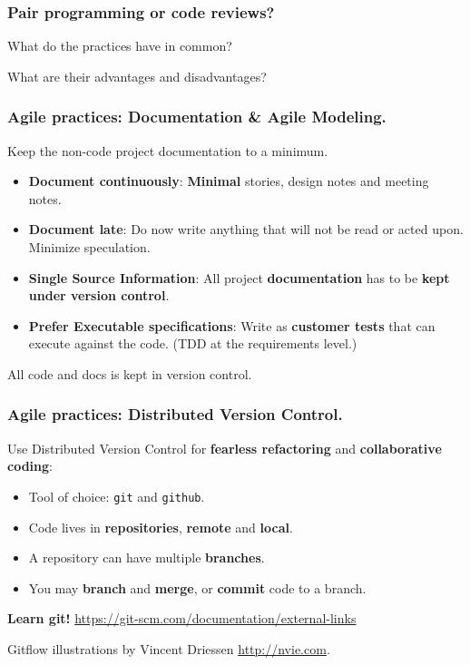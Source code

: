 \documentclass{beamer} %
\newcommand\emc[1]{\textcolor{brightblue}{\textbf{#1}}}
\begin{document}
\begin{frame}
\frametitle{Pair programming or code reviews?}

What do the practices have in common?

\vspace{5mm}
What are their advantages and disadvantages?

\end{frame}



\begin{frame}

\frametitle{Agile practices: Documentation \& Agile Modeling.}

Keep the non-code project documentation to a minimum.
\begin{itemize}
\item \emc{Document continuously}: \emc{Minimal} stories, design notes and meeting notes.
\item \emc{Document late}: Do now write anything that will not be read or acted upon. Minimize speculation.
\item \emc{Single Source Information}: All project \emc{documentation} has to be \emc{kept under version control}.
\item \emc{Prefer Executable specifications}: Write as \emc{customer tests} that can execute against the code. (TDD at the requirements level.)
\end{itemize}

\vspace{5mm}
All code and docs is kept in version control.
\end{frame}

\begin{frame}

\frametitle{Agile practices: Distributed Version Control.}

Use Distributed Version Control for \emc{fearless refactoring} and \emc{collaborative coding}:
\begin{itemize}
  \item Tool of choice: \texttt{git} and \texttt{github}.
  \item Code lives in \emc{repositories}, \emc{remote} and \emc{local}.
  \item A repository can have multiple \emc{branches}. 
  \item You may \emc{branch} and \emc{merge}, or \emc{commit} code to a branch.
\end{itemize}

\vspace{5mm}
\emc{Learn git!} \url{https://git-scm.com/documentation/external-links} 

\vspace{5mm}
Gitflow illustrations by Vincent Driessen \url{http://nvie.com}.


\end{frame}
\end{document}
